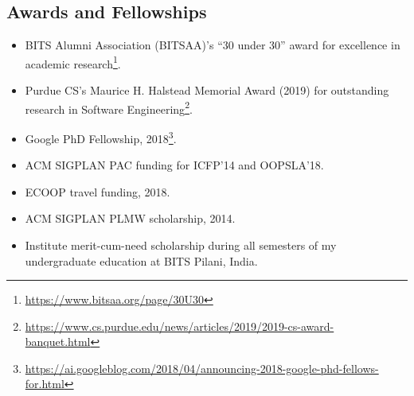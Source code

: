 \documentclass[margin,line]{res}
\begin{document}
\begin{resume}


\section{Awards and Fellowships}
\begin{itemize}
  \item BITS Alumni Association (BITSAA)'s ``30 under 30''
    award for excellence in academic research\footnote{\url{https://www.bitsaa.org/page/30U30}}.
  \item Purdue CS's Maurice H. Halstead Memorial Award (2019) for
    outstanding research in Software Engineering\footnote{\url{https://www.cs.purdue.edu/news/articles/2019/2019-cs-award-banquet.html}}.
  \item Google PhD Fellowship, 2018\footnote{\url{https://ai.googleblog.com/2018/04/announcing-2018-google-phd-fellows-for.html}}.
  \item ACM SIGPLAN PAC funding for ICFP'14 and OOPSLA'18.
  \item ECOOP travel funding, 2018.
  \item ACM SIGPLAN PLMW scholarship, 2014.
  \item Institute merit-cum-need scholarship during all semesters of
    my undergraduate education at BITS Pilani, India.
\end{itemize}


\end{resume}
\end{document}
